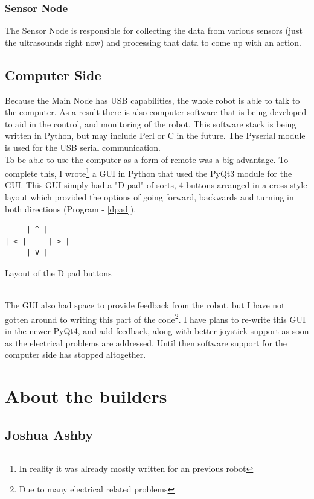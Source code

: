 \documentclass{article}
\begin{document}
\subsubsection{Sensor Node}
The Sensor Node is responsible for collecting the data from various sensors (just the ultrasounds right now) and processing that data to come up with an action.\\
\subsection{Computer Side}
Because the Main Node has USB capabilities, the whole robot is able to talk to the computer. As a result there is also computer software that is being developed to aid in the control, and monitoring of the robot. This software stack is being written in Python, but may include Perl or C in the future. The Pyserial module is used for the USB serial communication.\\
To be able to use the computer as a form of remote was a big advantage. To complete this, I wrote\footnote{In reality it was already mostly written for an previous robot} a GUI in Python that used the PyQt3 module for the GUI. This GUI simply had a "D pad" of sorts, 4 buttons arranged in a cross style layout which provided the options of going forward, backwards and turning in both directions (Program - \ref{dpad}).\\
\begin{program}
\begin{verbatim}
     | ^ | 
| < |     | > |
     | V |
\end{verbatim}
\caption{Layout of the D pad buttons}
\label{dpad}
\end{program}\\
The GUI also had space to provide feedback from the robot, but I have not gotten around to writing this part of the code\footnote{Due to many electrical related problems}. I have plans to re-write this GUI in the newer PyQt4, and add feedback, along with better joystick support as soon as the electrical problems are addressed. Until then software support for the computer side has stopped altogether.\\
\section{About the builders}
\subsection{Joshua Ashby}
\end{document}
